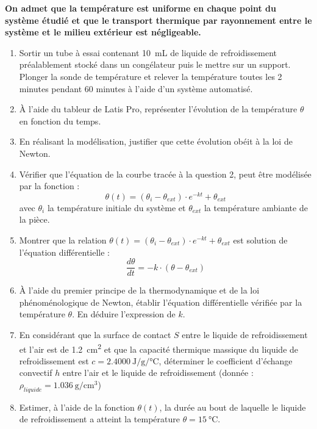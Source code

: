 \documentclass[a4paper,12pt,fleqn]{scrartcl}%
\begin{document}
\textbf{On admet que la température est uniforme en chaque point du système étudié et que le transport thermique par rayonnement entre le système et le milieu extérieur est négligeable.}
\begin{enumerate}
    \item Sortir un tube à essai contenant \SI{10}{mL} de liquide de refroidissement préalablement stocké dans un congélateur puis le mettre sur un support. Plonger la sonde de température et relever la température toutes les 2 minutes pendant 60 minutes à l'aide d'un système automatisé.
    \item À l'aide du tableur de Latis Pro, représenter l'évolution de la température $\theta$ en fonction du temps.
    \item En réalisant la modélisation, justifier que cette évolution obéit à la loi de Newton.
    \item Vérifier que l'équation de la courbe tracée à la question 2, peut être modélisée par la fonction : $$\theta (t) = (\theta_i-\theta_{ext}) \cdot e^{-kt} + \theta_{ext}$$
    avec $\theta_i$ la température initiale du système et $\theta_{ext}$ la température ambiante de la pièce.
    \item Montrer que la relation $\theta(t) = (\theta_i-\theta_{ext}) \cdot e^{-kt} + \theta_{ext}$ est solution de l'équation différentielle : $$\dfrac{d\theta}{dt} = -k\cdot(\theta - \theta_{ext})$$
    \item À l'aide du premier principe de la thermodynamique et de la loi phénoménologique de Newton, établir l'équation différentielle vérifiée par la température $\theta$. En déduire l'expression de $k$.
    \item En considérant que la surface de contact $S$ entre le liquide de refroidissement et l'air est de \SI{1,2}{\centi\meter\squared} et que la capacité thermique massique du liquide de refroidissement est $c=\SI{2,4000}{\joule\per\gram\per\celsius}$, déterminer le coefficient d'échange convectif $h$ entre l'air et le liquide de refroidissement (donnée : $\rho_{liquide}=\SI{1,036}{\gram\per\centi\meter\cubed}$)
    \item Estimer, à l'aide de la fonction $\theta(t)$, la durée au bout de laquelle le liquide de refroidissement a atteint la température $\theta = \SI{15}{\celsius}$.
\end{enumerate}
\end{document}
